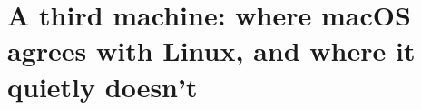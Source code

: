 \chapter{A third machine: where macOS agrees with Linux, and where it quietly doesn't}
\label{ch:a-third-machine-where-macos-agrees-with}

